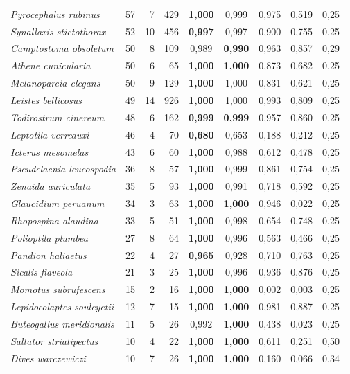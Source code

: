 \begin{longtable}{lrrrccccc}
\textit{Pyrocephalus rubinus} & 57 & 7 & 429 & \textbf{1{,}000} & 0{,}999 & 0{,}975 & 0{,}519 & 0{,}25\\
\textit{Synallaxis stictothorax} & 52 & 10 & 456 & \textbf{0{,}997} & 0{,}997 & 0{,}900 & 0{,}755 & 0{,}25\\
\textit{Camptostoma obsoletum} & 50 & 8 & 109 & 0{,}989 & \textbf{0{,}990} & 0{,}963 & 0{,}857 & 0{,}29\\
\textit{Athene cunicularia} & 50 & 6 & 65 & \textbf{1{,}000} & \textbf{1{,}000} & 0{,}873 & 0{,}682 & 0{,}25\\
\textit{Melanopareia elegans} & 50 & 9 & 129 & \textbf{1{,}000} & 1{,}000 & 0{,}831 & 0{,}621 & 0{,}25\\
\textit{Leistes bellicosus} & 49 & 14 & 926 & \textbf{1{,}000} & 1{,}000 & 0{,}993 & 0{,}809 & 0{,}25\\
\textit{Todirostrum cinereum} & 48 & 6 & 162 & \textbf{0{,}999} & \textbf{0{,}999} & 0{,}957 & 0{,}860 & 0{,}25\\
\textit{Leptotila verreauxi} & 46 & 4 & 70 & \textbf{0{,}680} & 0{,}653 & 0{,}188 & 0{,}212 & 0{,}25\\
\textit{Icterus mesomelas} & 43 & 6 & 60 & \textbf{1{,}000} & 0{,}988 & 0{,}612 & 0{,}478 & 0{,}25\\
\textit{Pseudelaenia leucospodia} & 36 & 8 & 57 & \textbf{1{,}000} & 0{,}999 & 0{,}861 & 0{,}754 & 0{,}25\\
\textit{Zenaida auriculata} & 35 & 5 & 93 & \textbf{1{,}000} & 0{,}991 & 0{,}718 & 0{,}592 & 0{,}25\\
\textit{Glaucidium peruanum} & 34 & 3 & 63 & \textbf{1{,}000} & \textbf{1{,}000} & 0{,}946 & 0{,}022 & 0{,}25\\
\textit{Rhopospina alaudina} & 33 & 5 & 51 & \textbf{1{,}000} & 0{,}998 & 0{,}654 & 0{,}748 & 0{,}25\\
\textit{Polioptila plumbea} & 27 & 8 & 64 & \textbf{1{,}000} & 0{,}996 & 0{,}563 & 0{,}466 & 0{,}25\\
\textit{Pandion haliaetus} & 22 & 4 & 27 & \textbf{0{,}965} & 0{,}928 & 0{,}710 & 0{,}763 & 0{,}25\\
\textit{Sicalis flaveola} & 21 & 3 & 25 & \textbf{1{,}000} & 0{,}996 & 0{,}936 & 0{,}876 & 0{,}25\\
\textit{Momotus subrufescens} & 15 & 2 & 16 & \textbf{1{,}000} & \textbf{1{,}000} & 0{,}002 & 0{,}003 & 0{,}25\\
\textit{Lepidocolaptes souleyetii} & 12 & 7 & 15 & \textbf{1{,}000} & \textbf{1{,}000} & 0{,}981 & 0{,}887 & 0{,}25\\
\textit{Buteogallus meridionalis} & 11 & 5 & 26 & 0{,}992 & \textbf{1{,}000} & 0{,}438 & 0{,}023 & 0{,}25\\
\textit{Saltator striatipectus} & 10 & 4 & 22 & \textbf{1{,}000} & \textbf{1{,}000} & 0{,}611 & 0{,}251 & 0{,}50\\
\textit{Dives warczewiczi} & 10 & 7 & 26 & \textbf{1{,}000} & \textbf{1{,}000} & 0{,}160 & 0{,}066 & 0{,}34\\
\end{longtable}
\endgroup
